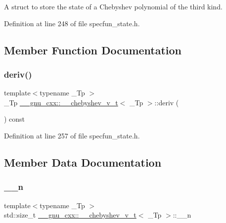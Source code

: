 A struct to store the state of a Chebyshev polynomial of the third kind. 

Definition at line 248 of file specfun\+\_\+state.\+h.



\subsection{Member Function Documentation}
\mbox{\label{struct____gnu__cxx_1_1____chebyshev__v__t_a3ac7c3f4a04b5ec272f73c5dde89f218}} 
\subsubsection{\texorpdfstring{deriv()}{deriv()}}
{\footnotesize\ttfamily template$<$typename \+\_\+\+Tp $>$ \\
\+\_\+\+Tp \hyperlink{struct____gnu__cxx_1_1____chebyshev__v__t}{\+\_\+\+\_\+gnu\+\_\+cxx\+::\+\_\+\+\_\+chebyshev\+\_\+v\+\_\+t}$<$ \+\_\+\+Tp $>$\+::deriv (\begin{DoxyParamCaption}{ }\end{DoxyParamCaption}) const\hspace{0.3cm}{\ttfamily [inline]}}



Definition at line 257 of file specfun\+\_\+state.\+h.



\subsection{Member Data Documentation}
\mbox{\label{struct____gnu__cxx_1_1____chebyshev__v__t_a067e7824e548f68733ae84d6e368ca48}} 
\subsubsection{\texorpdfstring{\+\_\+\+\_\+n}{\_\_n}}
{\footnotesize\ttfamily template$<$typename \+\_\+\+Tp $>$ \\
std\+::size\+\_\+t \hyperlink{struct____gnu__cxx_1_1____chebyshev__v__t}{\+\_\+\+\_\+gnu\+\_\+cxx\+::\+\_\+\+\_\+chebyshev\+\_\+v\+\_\+t}$<$ \+\_\+\+Tp $>$\+::\+\_\+\+\_\+n}



